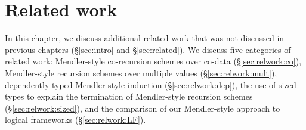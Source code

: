 \chapter{Related work}\label{ch:relwork}
In this chapter, we discuss additional related work that was not
discussed in previous chapters (\S\ref{sec:intro} and \S\ref{sec:related}).
We discuss five categories of related work:
Mendler-style co-recursion schemes over co-data (\S\ref{sec:relwork:co}),
Mendler-style recursion schemes over multiple values (\S\ref{sec:relwork:mult}),
dependently typed Mendler-style induction (\S\ref{sec:relwork:dep}), 
the use of sized-types to explain the termination of Mendler-style
recursion schemes (\S\ref{sec:relwork:sized}), and the comparison of
our Mendler-style approach to logical frameworks (\S\ref{sec:relwork:LF}).




